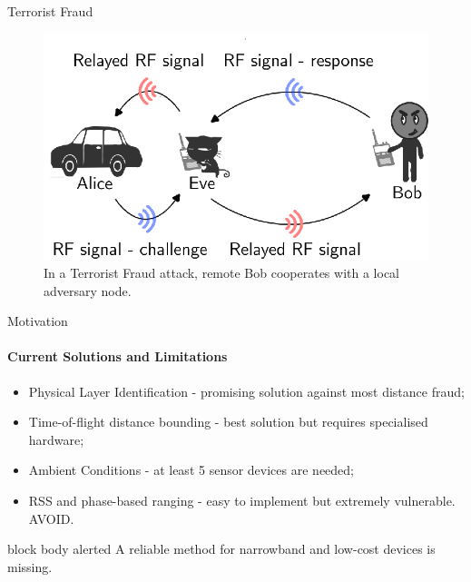 \begin{frame}{Terrorist Fraud}
    \begin{figure}
        \centering
        \includegraphics[scale = 0.9]{slides/figures/terrorist_fraud.eps}
        \caption{In a Terrorist Fraud attack, remote Bob cooperates with a local adversary node.}
        \label{fig:enter-label}
    \end{figure}
\end{frame}



\begin{frame}{Motivation}

\framesubtitle{Current Solutions and Limitations}
    \begin{itemize}
        \item Physical Layer Identification - promising solution against most distance fraud;
        \item Time-of-flight distance bounding - best solution but requires specialised hardware;
        \item Ambient Conditions - at least 5 sensor devices are needed;
        \item RSS and phase-based ranging - easy to implement but extremely vulnerable. AVOID.
    \end{itemize}
\vspace{2pt}
\begin{beamercolorbox}[colsep=1.5pt,rounded=true,shadow=true]{block body alerted}
A reliable method for narrowband and low-cost devices is missing.
\end{beamercolorbox}
\end{frame}

